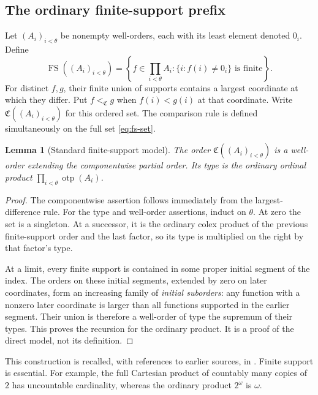 \documentclass[11pt,letterpaper]{article}
\newtheorem{lemma}[theorem]{Lemma}
\theoremstyle{definition}
\theoremstyle{remark}
\newcommand{\CC}{\mathfrak C}
\newcommand{\otp}{\operatorname{otp}}
\newcommand{\fs}{\operatorname{FS}}
\begin{document}
\subsection{The ordinary finite-support prefix}

Let $(A_i)_{i<\theta}$ be nonempty well-orders, each with its least element
denoted $0_i$. Define
\begin{equation}\label{eq:fs-set}
 \fs((A_i)_{i<\theta})
 =\left\{f\in\prod_{i<\theta}A_i:
        \{i:f(i)\ne0_i\}\text{ is finite}\right\}.
\end{equation}
For distinct $f,g$, their finite union of supports contains a largest
coordinate at which they differ. Put $f<_{\CC}g$ when $f(i)<g(i)$ at
that coordinate. Write $\CC((A_i)_{i<\theta})$ for this ordered set.
The comparison rule is defined simultaneously on the full set
\eqref{eq:fs-set}.

\begin{lemma}[Standard finite-support model]\label{lem:ordinary-model}
The order $\CC((A_i)_{i<\theta})$ is a well-order extending the
componentwise partial order. Its type is the ordinary ordinal product
$\prod_{i<\theta}\otp(A_i)$.
\end{lemma}

\begin{proof}
The componentwise assertion follows immediately from the largest-difference
rule. For the type and well-order assertions, induct on $\theta$.
At zero the set is a singleton. At a successor, it is the ordinary colex
product of the previous finite-support order and the last factor, so its
type is multiplied on the right by that factor's type.

At a limit, every finite support is contained in some proper initial
segment of the index. The orders on these initial segments, extended by
zero on later coordinates, form an increasing family of \emph{initial
suborders}: any function with a nonzero later coordinate is larger than
all functions supported in the earlier segment. Their union is therefore
a well-order of type the supremum of their types. This proves the
recursion for the ordinary product. It is a proof of the direct model,
not its definition.
\end{proof}

This construction is recalled, with references to earlier sources, in
\cite[Section~3.2]{lip-product}. Finite support is essential. For example,
the full Cartesian product of countably many copies of $2$ has uncountable
cardinality, whereas the ordinary product $2^\omega$ is $\omega$.
\end{document}
